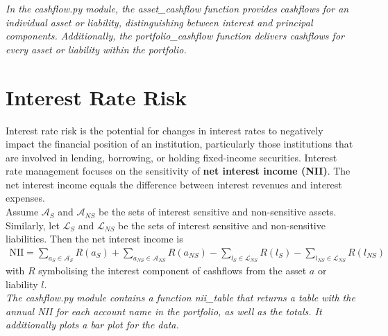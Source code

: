 \documentclass[11pt]{article}
\begin{document}
\textit{In the cashflow.py module, the asset\_cashflow function provides cashflows for an individual asset or liability, distinguishing between interest and principal components. Additionally, the portfolio\_cashflow function delivers cashflows for every asset or liability within the portfolio.}



\section{Interest Rate Risk}

Interest rate risk is the potential for changes in interest rates to negatively impact the financial position of an institution, particularly those institutions that are involved in lending, borrowing, or holding fixed-income securities. Interest rate management focuses on the sensitivity of \textbf{net interest income (NII)}.  The net interest income equals the difference between interest revenues and interest expenses.\\

Assume $\mathcal{A}_S$ and $\mathcal{A}_{NS}$ be the sets of interest sensitive and non-sensitive assets. Similarly, let $\mathcal{L}_S$ and $\mathcal{L}_{NS}$ be the sets of interest sensitive and non-sensitive liabilities. Then the net interest income is
\begin{align}
	\text{NII}=\sum_{a_S\in\mathcal{A}_S}R(a_S)+\sum_{a_{NS}\in\mathcal{A}_{NS}}R(a_{NS})-\sum_{l_S\in\mathcal{L}_{NS}}R(l_S)-\sum_{l_{NS}\in\mathcal{L}_{NS}}R(l_{NS})
\end{align}
with $R$ symbolising the interest component of cashflows from the asset $a$ or liability $l$.\\


\textit{The \textit{cashflow.py} module contains a function \textit{nii\_table} that returns a table with the annual NII for each account name in the portfolio, as well as the totals. It additionally plots a bar plot for the data.} \\
\end{document}
